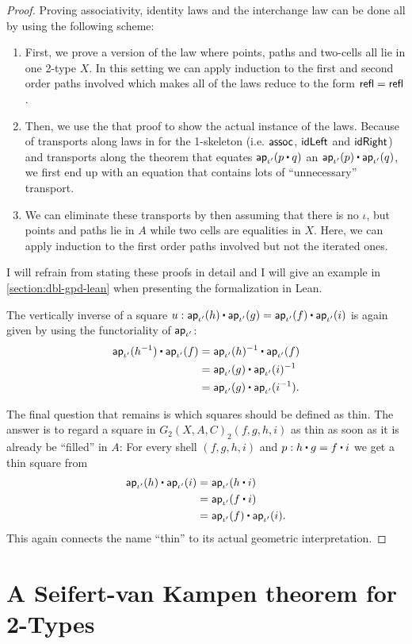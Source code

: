 \begin{proof}
Proving associativity, identity laws and the interchange law can be done all by
using the following scheme:
\begin{enumerate}
\item First, we prove a version of the law where points, paths and two-cells
all lie in one 2-type $X$.
In this setting we can apply induction to the first and second order paths involved
which makes all of the laws reduce to the form $\mathsf{refl} = \mathsf{refl}$.
\item Then, we use the that proof to show the actual instance of the laws.
Because of transports along laws in for the 1-skeleton 
(i.e. $\mathsf{assoc}$, $\mathsf{idLeft}$ and $\mathsf{idRight}$) and transports along the theorem that
equates $\apiop(p \ct q)$ an $\apiop(p) \ct \apiop(q)$, we first end up with an
equation that contains lots of ``unnecessary'' transport. 
\item We can eliminate these
transports by then assuming that there is no $\iota$, but points and paths
lie in $A$ while two cells are equalities in $X$.
Here, we can apply induction to the first order paths involved but not the iterated ones.
\end{enumerate}
I will refrain from stating these proofs in detail and I will give an example in
\ref{section:dbl-gpd-lean} when presenting the formalization in Lean. %

The vertically inverse of a square $u : \apiop(h) \ct \apiop(g) 
= \apiop(f) \ct \apiop(i)$ is again given by using the functoriality
of $\mathsf{ap}_{\iota'}$:
\begin{align*}
\apiop(h\inv) \ct \apiop(f) &= \apiop(h)\inv \ct \apiop(f) \\
	&= \apiop(g) \ct \apiop(i)\inv \\
	&= \apiop(g) \ct \apiop(i\inv) \text{.} \\	
\end{align*}

The final question that remains is which squares should be defined as thin.
The answer is to regard a square in $G_2(X,A,C)_2(f,g,h,i)$ as thin as soon as
it is already be ``filled''
in $A$: For every shell $(f,g,h,i)$ and $p : h \ct g = f \ct i$ we get a thin
square from
\begin{align*}
\apiop(h) \ct \apiop(i) &= \apiop(h \ct i) \\
	&= \apiop(f \ct i) \\
	&= \apiop(f) \ct \apiop(i) \text{.}
\end{align*}
This again connects the name ``thin'' to its actual geometric interpretation.
\end{proof}

\section{A Seifert-van Kampen theorem for 2-Types}

